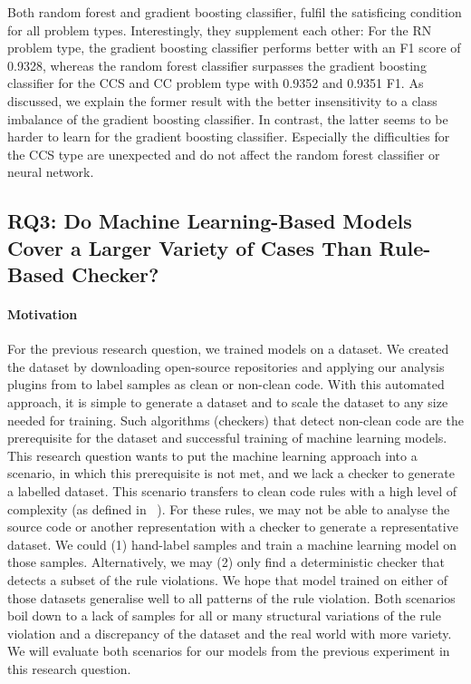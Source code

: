  Both random forest and gradient boosting classifier, fulfil the satisficing condition for all problem types. Interestingly, they supplement each other: For the RN problem type, the gradient boosting classifier performs better with an F1 score of 0.9328, whereas the random forest classifier surpasses the gradient boosting classifier for the CCS and CC problem type with 0.9352 and 0.9351 F1. As discussed, we explain the former result with the better insensitivity to a class imbalance of the gradient boosting classifier. In contrast, the latter seems to be harder to learn for the gradient boosting classifier. Especially the difficulties for the CCS type are unexpected and do not affect the random forest classifier or neural network.

\subsection{RQ3: Do Machine Learning-Based Models Cover a Larger Variety of Cases Than Rule-Based Checker? }\label{rq:3}

\paragraph{Motivation}
For the previous research question, we trained models on a dataset. We created the dataset by downloading open-source repositories and applying our analysis plugins from  to label samples as clean or non-clean code. With this automated approach, it is simple to generate a dataset and to scale the dataset to any size needed for training. Such algorithms (checkers) that detect non-clean code are the prerequisite for the dataset and successful training of machine learning models. This research question wants to put the machine learning approach into a scenario, in which this prerequisite is not met, and we lack a checker to generate a labelled dataset. 
This scenario transfers to clean code rules with a high level of complexity (as defined in ~). For these rules, we may not be able to analyse the source code or another representation with a checker to generate a representative dataset. We could (1) hand-label samples and train a machine learning model on those samples. Alternatively, we may (2) only find a deterministic checker that detects a subset of the rule violations. We hope that model trained on either of those datasets generalise well to all patterns of the rule violation. Both scenarios boil down to a lack of samples for all or many structural variations of the rule violation and a discrepancy of the dataset and the real world with more variety. We will evaluate both scenarios for our models from the previous experiment in this research question.


